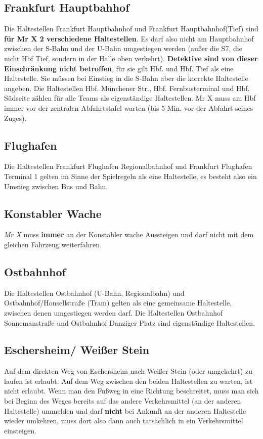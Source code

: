 \documentclass[12pt,a4paper]{article}
\begin{document}
\subsection{Frankfurt Hauptbahhof}
Die Haltestellen Frankfurt Hauptbahnhof und Frankfurt Hauptbahnhof(Tief) sind \textbf{für Mr X 2 verschiedene Haltestellen}.
Es darf also nicht am Hauptbahnhof zwischen der S-Bahn und der U-Bahn umgestiegen werden (außer  die S7, die nicht Hbf Tief, sondern in der Halle oben verkehrt).
\textbf{Detektive sind von dieser Einschränkung nicht betroffen}, für sie gilt Hbf. und Hbf. Tief als eine Haltestelle.
Sie müssen bei Einstieg in die S-Bahn aber die korrekte Haltestelle angeben.
Die Haltestellen Hbf. Münchener Str., Hbf. Fernbusterminal und Hbf. Südseite zählen für alle Teams als eigenständige Haltestellen.
Mr X muss am Hbf immer vor der zentralen Abfahrtstafel warten (bis 5 Min. vor der Abfahrt seines Zuges).

\subsection{Flughafen}
Die Haltestellen Frankfurt Flughafen Regionalbahnhof und Frankfurt Flughafen Terminal 1 gelten im Sinne der Spielregeln als eine Haltestelle, es besteht also ein Umstieg zwischen Bus und Bahn.

\subsection{Konstabler Wache}
\textit{Mr X} muss \textbf{immer} an der Konstabler wache Aussteigen und darf nicht mit dem gleichen Fahrzeug weiterfahren.

\subsection{Ostbahnhof}
Die Haltestellen Ostbahnhof (U-Bahn, Regionalbahn) und Ostbahnhof/Honsellstraße (Tram) gelten als eine gemeinsame Haltestelle, zwischen denen umgestiegen werden darf.
Die Haltestellen Ostbahnhof Sonnemanstraße und Ostbahnhof Danziger Platz sind eigenständige Haltestellen.

\subsection{Eschersheim/ Weißer Stein}
Auf dem direkten Weg von Eschersheim nach Weißer Stein (oder umgekehrt) zu laufen ist erlaubt. 
Auf dem Weg zwischen den beiden Haltestellen zu warten, ist nicht erlaubt.
Wenn man den Fußweg in eine Richtung beschreitet, muss man sich bei Beginn des Weges bereits auf das andere Verkehrsmittel (an der anderen Haltestelle) ummelden und darf \textbf{nicht} bei Ankunft an der anderen Haltestelle wieder umkehren, muss dort also dann auch tatsächlich in ein Verkehrsmittel einsteigen.
\end{document}

